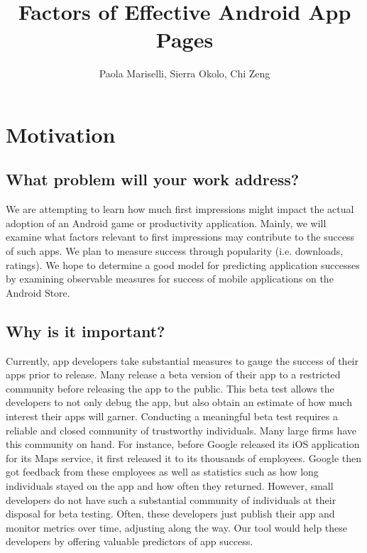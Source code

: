 \documentclass{article}
\title{Factors of Effective Android App Pages}
\author{Paola Mariselli, Sierra Okolo, Chi Zeng}
\date{}
\begin{document}
\maketitle


\pagebreak
\section{Motivation}

\subsection{What problem will your work address?}

We are attempting to learn how much first impressions might impact the actual adoption of an Android game or productivity application. Mainly, we will examine what factors relevant to first impressions may contribute to the success of such apps. We plan to measure success through popularity (i.e. downloads, ratings). We hope to determine a good model for predicting application successes by examining observable measures for success of mobile applications on the Android Store.

\subsection{Why is it important?}

Currently, app developers take substantial measures to gauge the success of their apps prior to release. Many release a beta version of their app to a restricted community before releasing the app to the public. This beta test allows the developers to not only debug the app, but also obtain an estimate of how much interest their apps will garner. Conducting a meaningful beta test requires a reliable and closed community of trustworthy individuals. Many large firms have this community on hand. For instance, before Google released its iOS application for its Maps service, it first released it to its thousands of employees. Google then got feedback from these employees as well as statistics such as how long individuals stayed on the app and how often they returned. However, small developers do not have such a substantial community of individuals at their disposal for beta testing. Often, these developers just publish their app and monitor metrics over time, adjusting along the way. Our tool would help these developers by offering valuable predictors of app success. \\
\end{document}
